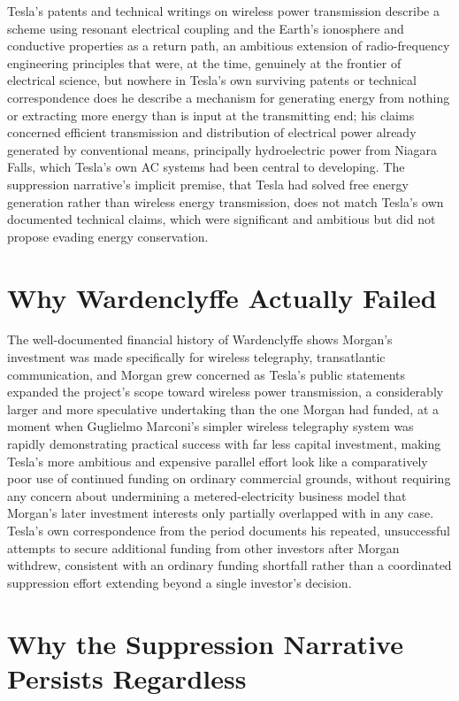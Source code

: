 \documentclass[11pt]{article}
\begin{document}
Tesla's patents and technical writings on wireless power transmission describe a scheme using resonant electrical coupling and the Earth's ionosphere and conductive properties as a return path, an ambitious extension of radio-frequency engineering principles that were, at the time, genuinely at the frontier of electrical science, but nowhere in Tesla's own surviving patents or technical correspondence does he describe a mechanism for generating energy from nothing or extracting more energy than is input at the transmitting end; his claims concerned efficient transmission and distribution of electrical power already generated by conventional means, principally hydroelectric power from Niagara Falls, which Tesla's own AC systems had been central to developing. The suppression narrative's implicit premise, that Tesla had solved free energy generation rather than wireless energy transmission, does not match Tesla's own documented technical claims, which were significant and ambitious but did not propose evading energy conservation.

\section{Why Wardenclyffe Actually Failed}

The well-documented financial history of Wardenclyffe shows Morgan's investment was made specifically for wireless telegraphy, transatlantic communication, and Morgan grew concerned as Tesla's public statements expanded the project's scope toward wireless power transmission, a considerably larger and more speculative undertaking than the one Morgan had funded, at a moment when Guglielmo Marconi's simpler wireless telegraphy system was rapidly demonstrating practical success with far less capital investment, making Tesla's more ambitious and expensive parallel effort look like a comparatively poor use of continued funding on ordinary commercial grounds, without requiring any concern about undermining a metered-electricity business model that Morgan's later investment interests only partially overlapped with in any case. Tesla's own correspondence from the period documents his repeated, unsuccessful attempts to secure additional funding from other investors after Morgan withdrew, consistent with an ordinary funding shortfall rather than a coordinated suppression effort extending beyond a single investor's decision.

\section{Why the Suppression Narrative Persists Regardless}
\end{document}
